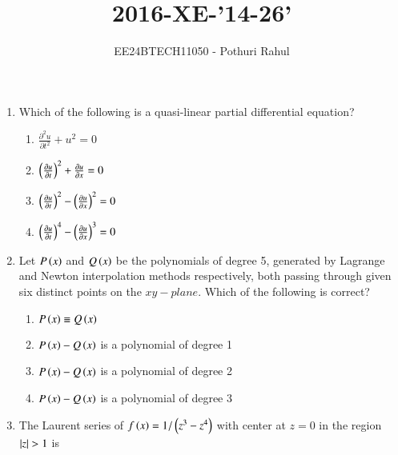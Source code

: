 \documentclass[journal]{IEEEtran}
\begin{document}

\vspace{3cm}
\title{2016-XE-'14-26'}
\author{EE24BTECH11050 - Pothuri Rahul}
{\let\newpage\relax\maketitle}
\renewcommand{\thefigure}{\theenumi}
\renewcommand{\thetable}{\theenumi}
\setlength{\intextsep}{10pt} %
\renewcommand{\thetable}{\theenumi}
\begin{enumerate}[start=4]
\item %
Which of the following is a quasi-linear partial differential equation?
\begin{enumerate}
\item $ \frac{\partial ^2 u}{\partial t^2} + u^2 = 0$
\item $ \left(\frac{\partial u}{\partial t}\right) ^2 + \frac{\partial u}{\partial x} =0$
\item $ \left(\frac{\partial u}{\partial t}\right) ^2 - \left(\frac{\partial u}{\partial x}\right) ^2 = 0$
\item $ \left(\frac{\partial u}{\partial t}\right) ^4 - \left(\frac{\partial u}{\partial x}\right) ^3 = 0$
\end{enumerate}
\item %
Let $P\left(x\right)$ and $Q\left(x\right)$ be the polynomials of degree 5, generated by Lagrange and Newton interpolation methods respectively, both passing through given six distinct points on the $xy-plane$. Which of the following is correct?
\begin{enumerate}
\item $P\left(x\right)\equiv Q\left(x\right)$
\item $P\left(x\right) - Q\left(x\right)$ is a polynomial of degree 1
\item $P\left(x\right) - Q\left(x\right)$ is a polynomial of degree 2
\item $P\left(x\right) - Q\left(x\right)$ is a polynomial of degree 3
\end{enumerate}
\item %
The Laurent series of $ f\left(x\right)=1/\left(z^3 - z^4\right) $ with center at $z=0$ in the region $\left\vert z\right\vert>1$ is 
\begin{enumerate}
\end{enumerate}
\end{enumerate}
\end{document}
